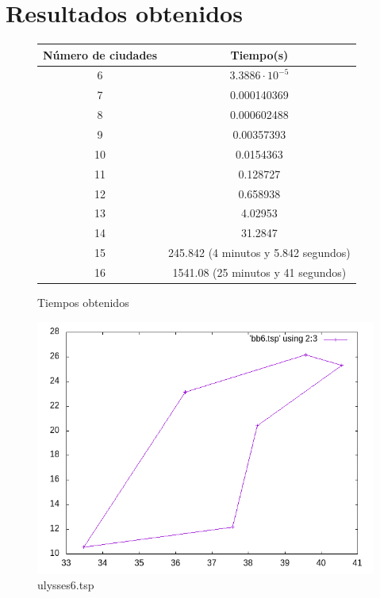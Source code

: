 \documentclass[12pt,spanish]{article}
\begin{document}
\section{Resultados obtenidos}

\begin{figure}[H]
\centering
\begin{tabular}{|c|c|}
\hline
\textbf{Número de ciudades} & \textbf{Tiempo(s)}\\
\hline
6 & $3.3886 \cdot 10^{-5}$\\
\hline
7 & 0.000140369\\
\hline
8 & 0.000602488\\
\hline
9 & 0.00357393\\
\hline
10 & 0.0154363\\
\hline
11 & 0.128727\\
\hline
12 & 0.658938\\
\hline
13 & 4.02953\\
\hline
14 & 31.2847\\
\hline
15 & 245.842 (4 minutos y 5.842 segundos)\\
\hline
16 & 1541.08 (25 minutos y 41 segundos)\\
\hline
\end{tabular}
\caption{Tiempos obtenidos}
\end{figure}

\begin{figure}[H]
\centering
\includegraphics[scale=0.75]{bb6.png}
\caption{ulysses6.tsp}
\end{figure}
\end{document}
